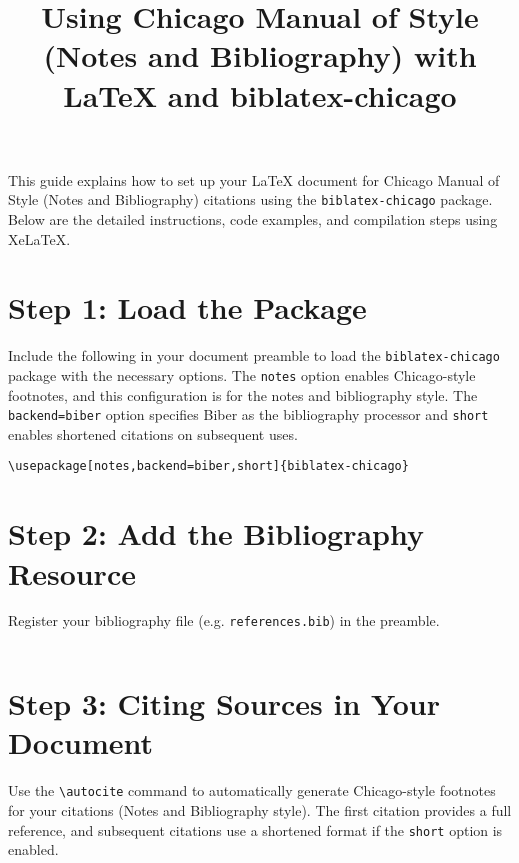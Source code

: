 \documentclass{article}
\title{Using Chicago Manual of Style (Notes and Bibliography) with LaTeX and biblatex-chicago}
\author{}
\date{}
\begin{document}
\maketitle

This guide explains how to set up your LaTeX document for Chicago Manual of Style (Notes and Bibliography) citations using the \texttt{biblatex-chicago} package. Below are the detailed instructions, code examples, and compilation steps using XeLaTeX.

\vspace{1em}

\section*{Step 1: Load the Package}

Include the following in your document preamble to load the \texttt{biblatex-chicago} package with the necessary options. The \texttt{notes} option enables Chicago-style footnotes, and this configuration is for the notes and bibliography style. The \texttt{backend=biber} option specifies Biber as the bibliography processor and \texttt{short} enables shortened citations on subsequent uses.

\begin{lstlisting}
\usepackage[notes,backend=biber,short]{biblatex-chicago}
\end{lstlisting}

\vspace{1em}

\section*{Step 2: Add the Bibliography Resource}

Register your bibliography file (e.g. \texttt{references.bib}) in the preamble.

\begin{lstlisting}

\end{lstlisting}

\vspace{1em}

\section*{Step 3: Citing Sources in Your Document}

Use the \verb|\autocite| command to automatically generate Chicago-style footnotes for your citations (Notes and Bibliography style). The first citation provides a full reference, and subsequent citations use a shortened format if the \texttt{short} option is enabled.
\end{document}

